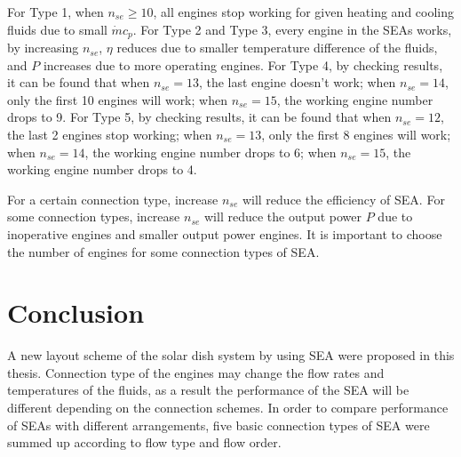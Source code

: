 For Type 1, when $n_{se} \geqslant 10$, all engines stop working for given heating and cooling fluids due to small $\dot{m}c_p$. For Type 2 and Type 3, every engine in the SEAs works, by increasing $n_{se}$, $\eta$ reduces due to smaller temperature difference of the fluids, and $P$ increases due to more operating engines. For Type 4, by checking results, it can be found that when $n_{se} = 13$,  the last engine doesn't work; when $n_{se} = 14$, only the first 10 engines will work; when $n_{se} = 15$, the working engine number drops to 9. For Type 5, by checking results, it can be found that when $n_{se} = 12$, the last 2 engines stop working; when $n_{se} = 13$, only the first 8 engines will work; when $n_{se} = 14$, the working engine number drops to 6; when $n_{se} = 15$, the working engine number drops to 4.

For a certain connection type, increase $n_{se}$ will reduce the efficiency of SEA. For some connection types, increase $n_{se}$ will reduce the output power $P$ due to inoperative engines and smaller output power engines. It is important to choose the number of engines for some connection types of SEA. 

\section{Conclusion}

A new layout scheme of the solar dish system by using SEA were proposed in this thesis. Connection type of the engines may change the flow rates and temperatures of the fluids, as a result the performance of the SEA will be different depending on the connection schemes. In order to compare performance of SEAs with different arrangements, five basic connection types of SEA were summed up according to flow type and flow order. 



